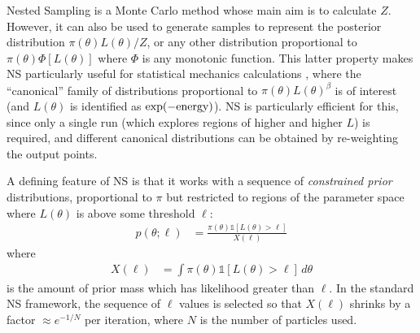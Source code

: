 \documentclass[article]{jss}
\begin{document}
Nested Sampling \citep[NS;][]{skilling} is a Monte Carlo method whose main
aim is to calculate $Z$. However, it can also be used to generate samples
to represent the posterior distribution $\pi(\theta)L(\theta)/Z$, or
any other distribution proportional to
$\pi(\theta)\Phi\left[L(\theta)\right]$ where $\Phi$ is any monotonic function.
This latter property makes NS particularly useful for statistical mechanics
calculations \citep{2009arXiv0906.3544P, 2015arXiv150303404B}, where the
``canonical'' family of distributions proportional to
$\pi(\theta)L(\theta)^\beta$ is of interest (and $L(\theta)$ is identified as
$\exp(-\textnormal{energy})$). NS is particularly efficient for this, since
only a single run (which explores regions of higher and higher $L$)
is required, and different canonical
distributions can be obtained by re-weighting the output points.

A defining feature of NS is that it works with a sequence of
{\em constrained prior} distributions, proportional to $\pi$ but
restricted to regions of the parameter space where $L(\theta)$
is above some threshold $\ell$:
\begin{align}
p(\theta; \ell) &=
\frac{\pi(\theta)\mathds{1}\left[L(\theta) > \ell\right]}{X(\ell)}
\label{eqn:constrained_prior}
\end{align}
where
\begin{align}
X(\ell) &= \int \pi(\theta) \mathds{1}\left[L(\theta) > \ell\right] \, d\theta
\end{align}
is the amount of prior mass which has likelihood greater than $\ell$.
In the standard NS framework, the sequence of $\ell$ values is selected
so that $X(\ell)$ shrinks by a factor $\approx e^{-1/N}$ per iteration, where
$N$ is the number of particles used.
\end{document}
